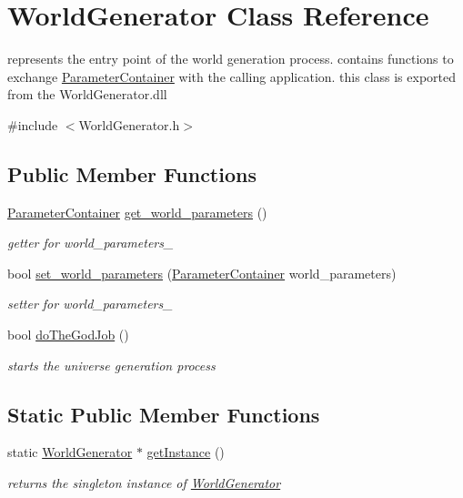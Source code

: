 \hypertarget{class_world_generator}{\section{World\-Generator Class Reference}
\label{class_world_generator}
}


represents the entry point of the world generation process. contains functions to exchange \hyperlink{struct_parameter_container}{Parameter\-Container} with the calling application. this class is exported from the World\-Generator.\-dll  




{\ttfamily \#include $<$World\-Generator.\-h$>$}

\subsection*{Public Member Functions}
\begin{DoxyCompactItemize}
\item 
\hyperlink{struct_parameter_container}{Parameter\-Container} \hyperlink{class_world_generator_ae6f6491b8dae06d237f23616479c755f}{get\-\_\-world\-\_\-parameters} ()
\begin{DoxyCompactList}\small\item\em getter for world\-\_\-parameters\-\_\- \end{DoxyCompactList}\item 
bool \hyperlink{class_world_generator_a5cd2d418569bf601b2d39fbb71c9f6eb}{set\-\_\-world\-\_\-parameters} (\hyperlink{struct_parameter_container}{Parameter\-Container} world\-\_\-parameters)
\begin{DoxyCompactList}\small\item\em setter for world\-\_\-parameters\-\_\- \end{DoxyCompactList}\item 
bool \hyperlink{class_world_generator_a6b5a256fd22a762b7e96b2d5e2b42be3}{do\-The\-God\-Job} ()
\begin{DoxyCompactList}\small\item\em starts the universe generation process \end{DoxyCompactList}\end{DoxyCompactItemize}
\subsection*{Static Public Member Functions}
\begin{DoxyCompactItemize}
\item 
static \hyperlink{class_world_generator}{World\-Generator} $\ast$ \hyperlink{class_world_generator_acd3544dd46ffa3d321e7b7677f7196b1}{get\-Instance} ()
\begin{DoxyCompactList}\small\item\em returns the singleton instance of \hyperlink{class_world_generator}{World\-Generator} \end{DoxyCompactList}\end{DoxyCompactItemize}
